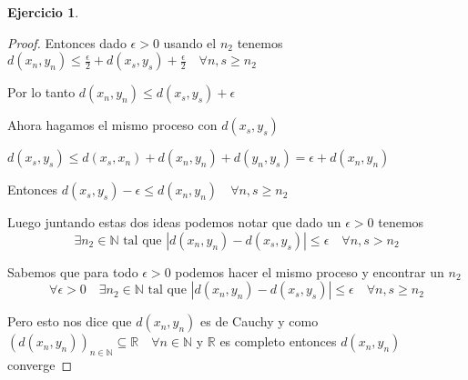 \documentclass[11pt]{report}
\newcommand{\R}{\mathbb{R}}
\newcommand{\N}{\mathbb{N}}
\theoremstyle{definition}
\newtheorem{ej}{Ejercicio}
\begin{document}
\begin{ej}
\begin{enumerate}
\begin{proof}
	Entonces dado $\epsilon > 0$ usando el $n_2$ tenemos $d(x_n,y_n) \leq \frac{\epsilon}{2} + d(x_s,y_s) + \frac{\epsilon}{2} \quad \forall n,s \geq n_2$

	Por lo tanto $d(x_n,y_n) \leq d(x_s,y_s) + \epsilon$ 
	
	Ahora hagamos el mismo proceso con $d(x_s,y_s)$ 

	$d(x_s,y_s) \leq d(x_s,x_n) + d(x_n,y_n) + d(y_n,y_s) = \epsilon + d(x_n,y_n)$

	Entonces $d(x_s,y_s) - \epsilon \leq d(x_n,y_n) \quad \forall n,s \geq n_2$
      
     Luego juntando estas dos ideas podemos notar que dado un $\epsilon > 0$ tenemos
     $$\exists n_2 \in \N \text{ tal que } |d(x_n,y_n) - d(x_s,y_s)| \leq \epsilon \quad \forall n,s > n_2$$ 

   Sabemos que para todo $\epsilon > 0$ podemos hacer el mismo proceso y encontrar un $n_2$ 
 $$\forall \epsilon > 0 \quad \exists n_2 \in \N \text{ tal que } |d(x_n,y_n) - d(x_s,y_s)| \leq \epsilon \quad \forall n,s \geq n_2$$ 

 Pero esto nos dice que $d(x_n,y_n)$ es de Cauchy y como $(d(x_n,y_n))_{n\in\N} \subseteq \R \quad \forall n \in \N$ y $\R$ es completo entonces $d(x_n,y_n)$ converge

      \end{proof}
  \end{enumerate}
\end{ej}
\end{document}
